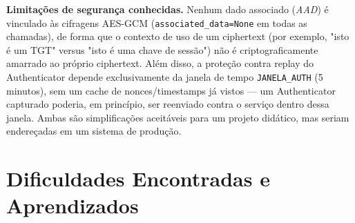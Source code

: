 \documentclass[11pt,a4paper]{article}
\begin{document}
\textbf{Limitações de segurança conhecidas.} Nenhum dado associado (\emph{AAD}) é
vinculado às cifragens AES-GCM (\texttt{associated\_data=None} em todas as chamadas), de
forma que o contexto de uso de um ciphertext (por exemplo, "isto é um TGT" versus "isto é
uma chave de sessão") não é criptograficamente amarrado ao próprio ciphertext. Além disso,
a proteção contra replay do Authenticator depende exclusivamente da janela de tempo
\texttt{JANELA\_AUTH} (5 minutos), sem um cache de nonces/timestamps já vistos --- um
Authenticator capturado poderia, em princípio, ser reenviado contra o serviço dentro dessa
janela. Ambas são simplificações aceitáveis para um projeto didático, mas seriam
endereçadas em um sistema de produção.

\section{Dificuldades Encontradas e Aprendizados}
\end{document}
